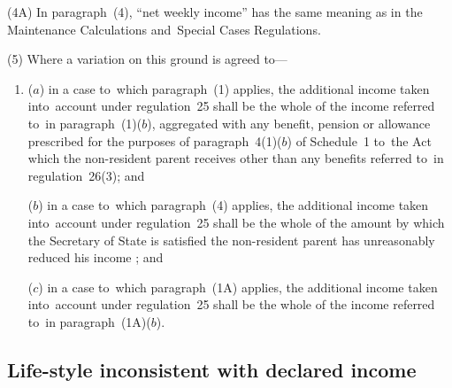 \documentclass[12pt,a4paper]{article}
\begin{document}
(4A) In paragraph~(4), “net weekly income” has the same meaning as in the Maintenance Calculations and~Special Cases Regulations.

(5) Where a variation on this ground is agreed to—
\begin{enumerate}\item[]
($a$) in a case to~which paragraph~(1) applies, the additional income taken into~account under regulation~25 shall be the whole of the income referred to~in paragraph~(1)($b$), aggregated with any benefit, pension or allowance 
prescribed for the purposes of paragraph~4(1)($b$)  of Schedule~1 to~the Act  %
which the non-resident parent receives other than any benefits referred to~in regulation~26(3); and

($b$) in a case to~which paragraph~(4) applies, the additional income taken into~account under regulation~25 shall be the whole of the amount by which the Secretary of State is satisfied the non-resident parent has unreasonably reduced his income%
%
; and

($c$) in a case to~which paragraph~(1A) applies, the additional income taken into~account under regulation~25 shall be the whole of the income referred to~in paragraph~(1A)($b$).
\end{enumerate}


\subsection[20. Life-style inconsistent with declared income]{Life-style inconsistent with declared income}
\end{document}

